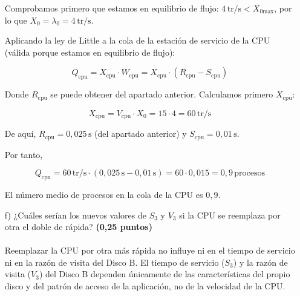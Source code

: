 \documentclass[a4paper,12pt]{article}
\begin{document}
\begin{enumerate}
    Comprobamos primero que estamos en equilibrio de flujo: $4\,\text{tr/s} < X_{0\text{max}}$, por lo que $X_0 = \lambda_0 = 4\,\text{tr/s}$.

    Aplicando la ley de Little a la cola de la estación de servicio de la CPU (válida porque estamos en equilibrio de flujo):

    \[
    Q_{\text{cpu}} = X_{\text{cpu}} \cdot W_{\text{cpu}} = X_{\text{cpu}} \cdot (R_{\text{cpu}} - S_{\text{cpu}})
    \]

    Donde $R_{\text{cpu}}$ se puede obtener del apartado anterior. Calculamos primero $X_{\text{cpu}}$:

    \[
    X_{\text{cpu}} = V_{\text{cpu}} \cdot X_0 = 15 \cdot 4 = 60\,\text{tr/s}
    \]

    De aquí, $R_{\text{cpu}} = 0{,}025\,\text{s}$ (del apartado anterior) y $S_{\text{cpu}} = 0{,}01\,\text{s}$.

    Por tanto,

    \[
    Q_{\text{cpu}} = 60\,\text{tr/s} \cdot (0{,}025\,\text{s} - 0{,}01\,\text{s}) = 60 \cdot 0{,}015 = 0{,}9\,\text{procesos}
    \]

    El número medio de procesos en la cola de la CPU es $0{,}9$.






    \item[f)] ¿Cuáles serían los nuevos valores de $S_3$ y $V_3$ si la CPU se reemplaza por otra el doble de rápida? \textbf{(0,25 puntos)} \\\\
    Reemplazar la CPU por otra más rápida no influye ni en el tiempo de servicio ni en la razón de visita del Disco B. El tiempo de servicio ($S_3$) y la razón de visita ($V_3$) del Disco B dependen únicamente de las características del propio disco y del patrón de acceso de la aplicación, no de la velocidad de la CPU.


\end{enumerate}
\end{document}
